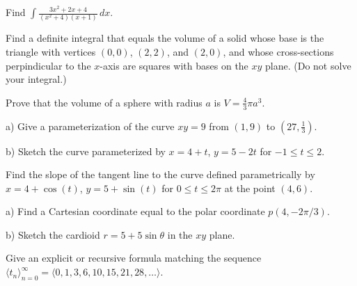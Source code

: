 \documentclass[12pt]{article}
\begin{document}
Find \(\displaystyle\int\frac{3x^2+2x+4}{(x^2+4)(x+1)}\,dx\).





Find a definite integral that equals the volume of a solid whose base
is the triangle with vertices \((0,0)\), \((2,2)\), and \((2,0)\),
and whose cross-sections perpindicular to the \(x\)-axis are squares
with bases on the \(xy\) plane. (Do not solve your integral.)





Prove that the volume of a sphere with radius \(a\)
is \(V=\frac{4}{3}\pi a^3\).






a) Give a parameterization of the curve \(xy=9\) from \((1,9)\) to
\((27,\frac{1}{3})\).

b) Sketch the curve parameterized by \(x=4+t\), \(y=5-2t\)
for \(-1\leq t\leq 2\).



\newpage




Find the slope of the tangent line to the curve defined
parametrically by \(x=4+\cos(t)\),
\(y=5+\sin(t)\) for \(0\leq t\leq 2\pi\) at the point \((4,6)\).




a) Find a Cartesian coordinate equal to the polar coordinate \(p(4,-2\pi/3)\).

b) Sketch the cardioid \(r=5+5\sin\theta\) in the \(xy\) plane.




Give an explicit or recursive formula matching the sequence
\(\langle t_n\rangle_{n=0}^\infty=\langle 0,1,3,6,10,15,21,28,\dots\rangle \).
\end{document}
